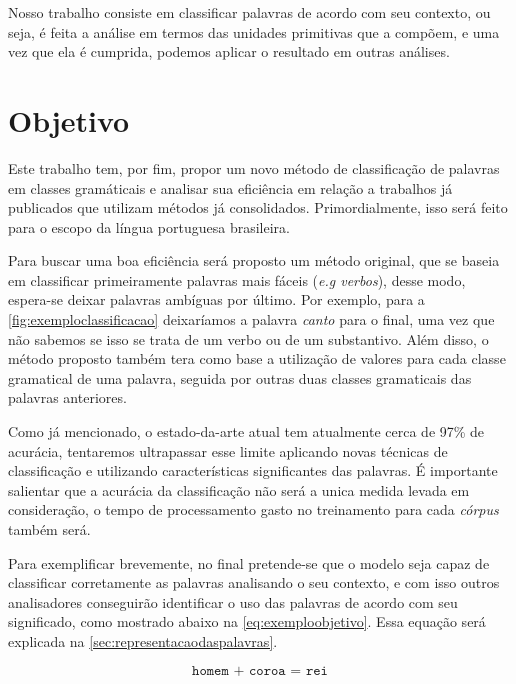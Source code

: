 Nosso trabalho consiste em classificar palavras de acordo com seu contexto, ou seja, é feita a análise em termos das unidades primitivas que a compõem, e uma vez que ela é cumprida, podemos aplicar o resultado em outras análises.


\section{Objetivo}\label{sec:objetivo}

Este trabalho tem, por fim, propor um novo método de classificação de palavras em classes gramáticais e analisar sua eficiência em relação a trabalhos já publicados que utilizam métodos já consolidados. Primordialmente, isso será feito para o escopo da língua portuguesa brasileira. 

Para buscar uma boa eficiência será proposto um método original, que se baseia em classificar primeiramente palavras mais fáceis (\textit{e.g verbos}), desse modo, espera-se deixar palavras ambíguas por último. Por exemplo, para a \autoref{fig:exemploclassificacao} deixaríamos a palavra \textit{canto} para o final, uma vez que não sabemos se isso se trata de um verbo ou de um substantivo.  
Além disso, o método proposto também tera como base a utilização de valores para cada classe gramatical de uma palavra, seguida por outras duas classes gramaticais das palavras anteriores. 

Como já mencionado, o estado-da-arte atual tem atualmente cerca de 97\% de acurácia, tentaremos ultrapassar esse limite aplicando novas técnicas de classificação e utilizando características significantes das palavras. É importante salientar que a acurácia da classificação não será a unica medida levada em consideração, o tempo de processamento gasto no treinamento para cada \textit{córpus} também será.

Para exemplificar brevemente, no final pretende-se que o modelo seja capaz de classificar corretamente as palavras analisando o seu contexto, e com isso outros analisadores conseguirão identificar o uso das palavras de acordo com seu significado, como mostrado abaixo na \autoref{eq:exemploobjetivo}. Essa equação será explicada na \autoref{sec:representacaodaspalavras}.

\begin{equation}
\texttt{homem + coroa = rei} \label{eq:exemploobjetivo}
\end{equation}



